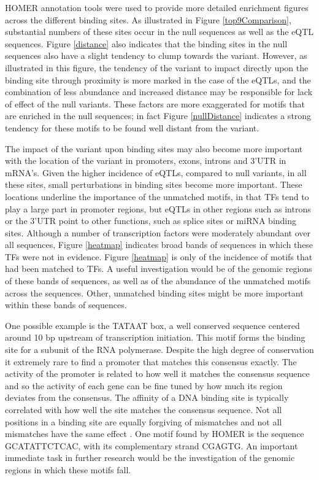 \documentclass[12pt]{article}
\begin{document}
HOMER annotation tools were used to provide more detailed enrichment figures across the different binding sites. As illustrated in Figure \ref{top9Comparison}, substantial numbers of these sites occur in the null sequences as well as the eQTL sequences. Figure \ref{distance} also indicates that the binding sites in the null sequences also have a slight tendency to clump towards the variant. However, as illustrated in this figure, the tendency of the variant to impact directly upon the binding site through proximity is more marked in the case of the eQTLs, and the combination of less abundance and increased distance may be responsible for lack of effect of the null variants. These factors are more exaggerated for motifs that are enriched in the null sequences; in fact Figure \ref{nullDistance} indicates a strong tendency for these motifs to be found well distant from the variant. 

The impact of the variant upon binding sites may also become more important with the location of the variant in promoters, exons, introns and 3'UTR in mRNA's. Given the higher incidence of eQTLs, compared to null variants, in all these sites, small perturbations in binding sites become more important. These locations underline the importance of the unmatched motifs, in that TFs tend to play a large part in promoter regions, but eQTLs in other regions such as introns or the 3'UTR point to other functions, such as splice sites or miRNA binding sites. Although a number of transcription factors were moderately abundant over all sequences, Figure \ref{heatmap} indicates broad bands of sequences in which these TFs were not in evidence. Figure \ref{heatmap} is only of the incidence of motifs that had been matched to TFs. A useful investigation would be of the genomic regions of these bands of sequences, as well as of the abundance of the unmatched motifs across the sequences. Other, unmatched binding sites might be more important within these bands of sequences. 

One possible example is the TATAAT box, a well conserved sequence centered around 10 bp upstream of transcription initiation. This motif forms the binding site for a subunit of the RNA polymerase. Despite the high degree of conservation it extremely rare to find a promoter that matches this consensus exactly. The activity of the promoter is related to how well it matches the consensus sequence and so the activity of each gene can be fine tuned by how much its region deviates from the consensus. The affinity of a DNA binding site is typically correlated with how well the site matches the consensus sequence. Not all positions in a binding site are equally forgiving of mismatches and not all mismatches have the same effect \citep{d2006dna}. One motif found by HOMER is the sequence GCATATTCTCAC, with its complementary strand CGAGTG. An important immediate task in further research would be the investigation of the genomic regions in which these motifs fall.
\end{document}
